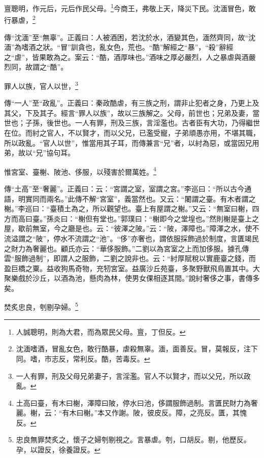 亶聰明，作元后，元后作民父母。\footnote{人誠聰明，則為大君，而為眾民父母。亶，丁但反。}今商王，弗敬上天，降災下民。沈湎冒色，敢行暴虐，\footnote{沈湎嗜酒，冒亂女色，敢行酷暴，虐殺無辜。湎，面善反。冒，莫報反，注下同。嗜，市志反，常利反。酷，苦毒反。}

{\noindent\shu{}\fzkt 傳“沈湎”至“無辜”。正義曰：人被酒困，若沈於水，酒變其色，湎然齊同，故“沈湎”為嗜酒之狀。“冒”訓貪也，亂女色，荒也。“酷”解經之“暴”，“殺”辭經之“虐”，皆果敢為之。案云：“酷，酒厚味也。”酒味之厚必嚴烈，人之暴虐與酒嚴烈同，故謂之“酷”。 \par}

罪人以族，官人以世，\footnote{一人有罪，刑及父母兄弟妻子，言淫濫。官人不以賢才，而以父兄，所以政亂。}

{\noindent\zhuan{}\fzbyks 傳“一人”至“政亂”。正義曰：秦政酷虐，有三族之刑，謂非止犯者之身，乃更上及其父，下及其子。經言“罪人以族”，故以三族解之。父母，前世也；兄弟及妻，當世也；子孫，後世也。一人有罪，刑及三族，言淫濫也。古者臣有大功，乃得繼世在位。而紂之官人，不以賢才，而以父兄，已濫受寵，子弟頑愚亦用，不堪其職，所以政亂。“官人以世”，惟當用其子耳，而傳兼言“兄”者，以紂為惡，或當因兄用弟，故以“兄”協句耳。 \par}

惟宮室、臺榭、陂池、侈服，以殘害於爾萬姓。\footnote{土高曰臺，有木曰榭，澤障曰陂，停水曰池，侈謂服飾過制。言匱民財力為奢麗。榭，云：“有木曰榭。”本又作謝。陂，彼皮反。障，之亮反。匱，其愧反。}

{\noindent\zhuan{}\fzbyks 傳“土高”至“奢麗”。正義曰：云：“宮謂之室，室謂之宮。”李巡曰：“所以古今通語，明實同而兩名。”此傳不解“宮室”，義當然也。又云：“闍謂之臺。有木者謂之榭。”李巡曰：“臺積土為之，所以觀望也。臺上有屋謂之榭。”又云：“無室曰榭，四方而高曰臺。”孫炎曰：“榭但有堂也。”郭璞曰：“榭即今之堂堭也。”然則榭是臺上之屋，歇前無室，今之廳是也。云：“彼澤之陂。”云：“陂，澤障也。”障澤之水，使不流溢謂之“陂”，停水不流謂之“池”。“侈”亦奢也，謂依服採飾過於制度，言匱竭民之財力為奢麗也。顧氏亦云：“華侈服飾。”二劉以為宮室之上而加侈服。據孔傳雲“服飾過制”，即謂人之服飾，二劉之說非也。云：“紂厚賦稅以實鹿臺之錢，而盈巨橋之粟。益收狗馬奇物，充牣宮室。益廣沙丘苑臺，多聚野獸飛鳥置其中。大聚樂戲於沙丘，以酒為池，懸肉為林，使男女倮相逐其間。”說紂奢侈之事，書傳多矣。 \par}

焚炙忠良，刳剔孕婦。\footnote{忠良無罪焚炙之，懷子之婦刳剔視之。言暴虐。刳，口胡反。剔，他歷反。孕，以證反，徐養證反。}

